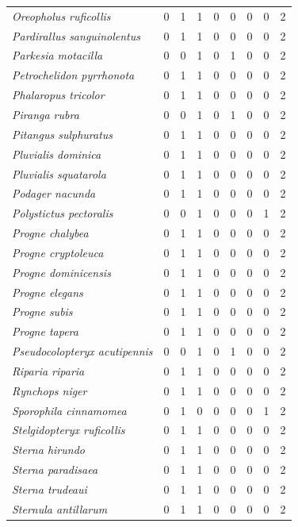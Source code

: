 \documentclass[
  oneside]{scrbook}
\begin{document}
\begin{longtable}[t]{>{}lrrrrrlrl}
\em{Oreopholus ruficollis} & 0 & 1 & 1 & 0 & 0 & 0 & 0 & 2\\
\em{Pardirallus sanguinolentus} & 0 & 1 & 1 & 0 & 0 & 0 & 0 & 2\\
\em{Parkesia motacilla} & 0 & 0 & 1 & 0 & 1 & 0 & 0 & 2\\
\addlinespace
\em{Petrochelidon pyrrhonota} & 0 & 1 & 1 & 0 & 0 & 0 & 0 & 2\\
\em{Phalaropus tricolor} & 0 & 1 & 1 & 0 & 0 & 0 & 0 & 2\\
\em{Piranga rubra} & 0 & 0 & 1 & 0 & 1 & 0 & 0 & 2\\
\em{Pitangus sulphuratus} & 0 & 1 & 1 & 0 & 0 & 0 & 0 & 2\\
\em{Pluvialis dominica} & 0 & 1 & 1 & 0 & 0 & 0 & 0 & 2\\
\addlinespace
\em{Pluvialis squatarola} & 0 & 1 & 1 & 0 & 0 & 0 & 0 & 2\\
\em{Podager nacunda} & 0 & 1 & 1 & 0 & 0 & 0 & 0 & 2\\
\em{Polystictus pectoralis} & 0 & 0 & 1 & 0 & 0 & 0 & 1 & 2\\
\em{Progne chalybea} & 0 & 1 & 1 & 0 & 0 & 0 & 0 & 2\\
\em{Progne cryptoleuca} & 0 & 1 & 1 & 0 & 0 & 0 & 0 & 2\\
\addlinespace
\em{Progne dominicensis} & 0 & 1 & 1 & 0 & 0 & 0 & 0 & 2\\
\em{Progne elegans} & 0 & 1 & 1 & 0 & 0 & 0 & 0 & 2\\
\em{Progne subis} & 0 & 1 & 1 & 0 & 0 & 0 & 0 & 2\\
\em{Progne tapera} & 0 & 1 & 1 & 0 & 0 & 0 & 0 & 2\\
\em{Pseudocolopteryx acutipennis} & 0 & 0 & 1 & 0 & 1 & 0 & 0 & 2\\
\addlinespace
\em{Riparia riparia} & 0 & 1 & 1 & 0 & 0 & 0 & 0 & 2\\
\em{Rynchops niger} & 0 & 1 & 1 & 0 & 0 & 0 & 0 & 2\\
\em{Sporophila cinnamomea} & 0 & 1 & 0 & 0 & 0 & 0 & 1 & 2\\
\em{Stelgidopteryx ruficollis} & 0 & 1 & 1 & 0 & 0 & 0 & 0 & 2\\
\em{Sterna hirundo} & 0 & 1 & 1 & 0 & 0 & 0 & 0 & 2\\
\addlinespace
\em{Sterna paradisaea} & 0 & 1 & 1 & 0 & 0 & 0 & 0 & 2\\
\em{Sterna trudeaui} & 0 & 1 & 1 & 0 & 0 & 0 & 0 & 2\\
\em{Sternula antillarum} & 0 & 1 & 1 & 0 & 0 & 0 & 0 & 2\\

\end{longtable}
\end{document}
